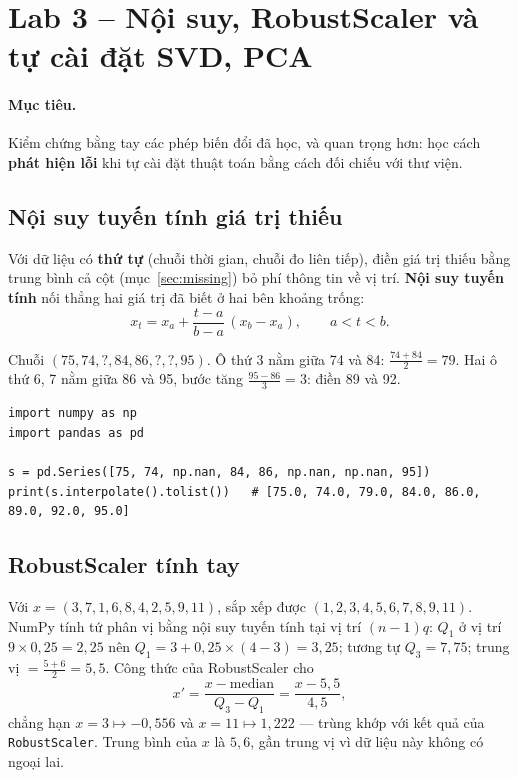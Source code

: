 \section{Lab 3 -- Nội suy, RobustScaler và tự cài đặt SVD, PCA}
\label{sec:lab-reduce}

\paragraph{Mục tiêu.} Kiểm chứng bằng tay các phép biến đổi đã học, và quan trọng hơn: học cách \textbf{phát hiện lỗi} khi tự cài đặt thuật toán bằng cách đối chiếu với thư viện.

\subsection{Nội suy tuyến tính giá trị thiếu}

Với dữ liệu có \textbf{thứ tự} (chuỗi thời gian, chuỗi đo liên tiếp), điền giá trị thiếu bằng trung bình cả cột (mục~\ref{sec:missing}) bỏ phí thông tin về vị trí. \textbf{Nội suy tuyến tính} nối thẳng hai giá trị đã biết ở hai bên khoảng trống:
\[
    x_t = x_a + \frac{t - a}{b - a}\,(x_b - x_a), \qquad a < t < b .
\]

\begin{example}
Chuỗi $(75, 74, ?, 84, 86, ?, ?, 95)$. Ô thứ 3 nằm giữa 74 và 84: $\frac{74 + 84}{2} = 79$. Hai ô thứ 6, 7 nằm giữa 86 và 95, bước tăng $\frac{95 - 86}{3} = 3$: điền 89 và 92.
\end{example}

\begin{lstlisting}[caption={Nội suy bằng pandas}]
import numpy as np
import pandas as pd

s = pd.Series([75, 74, np.nan, 84, 86, np.nan, np.nan, 95])
print(s.interpolate().tolist())   # [75.0, 74.0, 79.0, 84.0, 86.0, 89.0, 92.0, 95.0]
\end{lstlisting}

\subsection{RobustScaler tính tay}

Với $x = (3, 7, 1, 6, 8, 4, 2, 5, 9, 11)$, sắp xếp được $(1, 2, 3, 4, 5, 6, 7, 8, 9, 11)$. NumPy tính tứ phân vị bằng nội suy tuyến tính tại vị trí $(n - 1)q$: $Q_1$ ở vị trí $9 \times 0{,}25 = 2{,}25$ nên $Q_1 = 3 + 0{,}25 \times (4 - 3) = 3{,}25$; tương tự $Q_3 = 7{,}75$; trung vị $= \frac{5 + 6}{2} = 5{,}5$. Công thức của RobustScaler cho
\[
    x' = \frac{x - \text{median}}{Q_3 - Q_1} = \frac{x - 5{,}5}{4{,}5},
\]
chẳng hạn $x = 3 \mapsto -0{,}556$ và $x = 11 \mapsto 1{,}222$ --- trùng khớp với kết quả của \texttt{RobustScaler}. Trung bình của $x$ là $5{,}6$, gần trung vị vì dữ liệu này không có ngoại lai.

